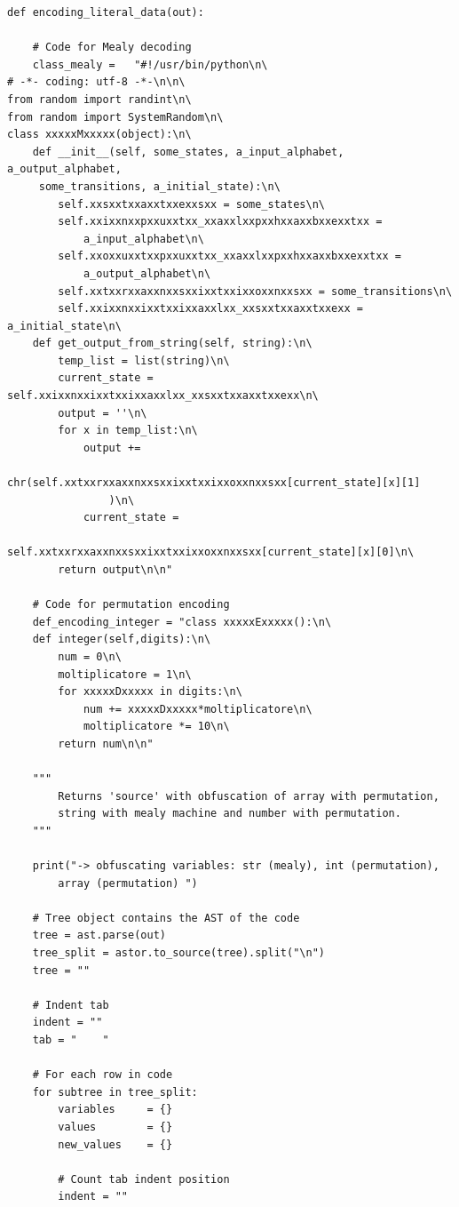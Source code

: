 \documentclass[a4paper,oneside,openright,titlepage,10pt,footinclude,headinclude]{scrbook}
\begin{document}
\begin{graybox}[innerleftmargin=2,]
\begin{lstlisting}
def encoding_literal_data(out):

    # Code for Mealy decoding
    class_mealy =   "#!/usr/bin/python\n\
# -*- coding: utf-8 -*-\n\n\
from random import randint\n\
from random import SystemRandom\n\
class xxxxxMxxxxx(object):\n\
    def __init__(self, some_states, a_input_alphabet, a_output_alphabet,
     some_transitions, a_initial_state):\n\
        self.xxsxxtxxaxxtxxexxsxx = some_states\n\
        self.xxixxnxxpxxuxxtxx_xxaxxlxxpxxhxxaxxbxxexxtxx = 
            a_input_alphabet\n\
        self.xxoxxuxxtxxpxxuxxtxx_xxaxxlxxpxxhxxaxxbxxexxtxx = 
            a_output_alphabet\n\
        self.xxtxxrxxaxxnxxsxxixxtxxixxoxxnxxsxx = some_transitions\n\
        self.xxixxnxxixxtxxixxaxxlxx_xxsxxtxxaxxtxxexx = a_initial_state\n\
    def get_output_from_string(self, string):\n\
        temp_list = list(string)\n\
        current_state = self.xxixxnxxixxtxxixxaxxlxx_xxsxxtxxaxxtxxexx\n\
        output = ''\n\
        for x in temp_list:\n\
            output += 
                chr(self.xxtxxrxxaxxnxxsxxixxtxxixxoxxnxxsxx[current_state][x][1]
                )\n\
            current_state = 
                self.xxtxxrxxaxxnxxsxxixxtxxixxoxxnxxsxx[current_state][x][0]\n\
        return output\n\n"

    # Code for permutation encoding
    def_encoding_integer = "class xxxxxExxxxx():\n\
    def integer(self,digits):\n\
        num = 0\n\
        moltiplicatore = 1\n\
        for xxxxxDxxxxx in digits:\n\
            num += xxxxxDxxxxx*moltiplicatore\n\
            moltiplicatore *= 10\n\
        return num\n\n"

    """
        Returns 'source' with obfuscation of array with permutation, 
        string with mealy machine and number with permutation.
    """

    print("-> obfuscating variables: str (mealy), int (permutation), 
        array (permutation) ")

    # Tree object contains the AST of the code
    tree = ast.parse(out)
    tree_split = astor.to_source(tree).split("\n")
    tree = ""

    # Indent tab
    indent = ""
    tab = "    "

    # For each row in code
    for subtree in tree_split:
        variables     = {}
        values        = {}
        new_values    = {}
        
        # Count tab indent position
        indent = ""


\end{lstlisting}
\end{graybox}
\end{document}
